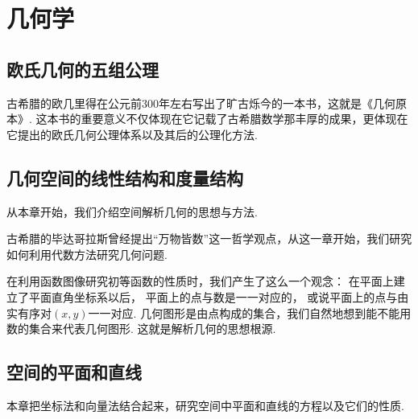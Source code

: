\part{几何学}

\chapter{欧氏几何的五组公理}
古希腊的欧几里得在公元前300年左右写出了旷古烁今的一本书，这就是《几何原本》.
这本书的重要意义不仅体现在它记载了古希腊数学那丰厚的成果，更体现在它提出的欧氏几何公理体系以及其后的公理化方法.










\chapter{几何空间的线性结构和度量结构}
从本章开始，我们介绍空间解析几何的思想与方法.

古希腊的毕达哥拉斯曾经提出“万物皆数”这一哲学观点，从这一章开始，我们研究如何利用代数方法研究几何问题.

在利用函数图像研究初等函数的性质时，我们产生了这么一个观念：
在平面上建立了平面直角坐标系以后，
平面上的点与数是一一对应的，
或说平面上的点与由实有序对\((x,y)\)一一对应.
几何图形是由点构成的集合，我们自然地想到能不能用数的集合来代表几何图形.
这就是解析几何的思想根源.








\chapter{空间的平面和直线}
本章把坐标法和向量法结合起来，研究空间中平面和直线的方程以及它们的性质.






